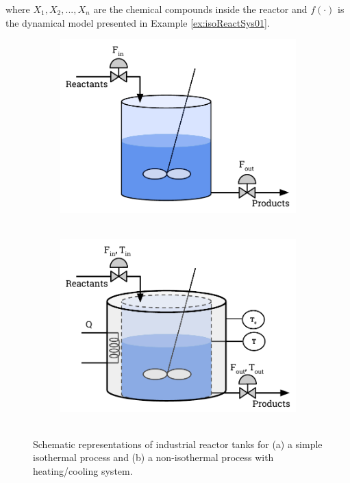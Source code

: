 \documentclass[a4paper,11pt]{book}
\numberwithin{figure}{chapter}
\numberwithin{equation}{chapter}
\numberwithin{table}{chapter}
\theoremstyle{definition}
\begin{document}
\noindent where $X_1, X_2, ..., X_n$ are the chemical compounds inside the reactor and $f(\cdot)$ is the dynamical model presented in Example \ref{ex:isoReactSys01}.

\begin{figure}[ht] 
    \centering
    \begin{subfigure}{0.49\textwidth}   
        \includegraphics[width=\textwidth]{chapter2/tank01}
        \caption{$\ \ \ \ \ $}  \label{fig:tank01a}
    \end{subfigure}
    \begin{subfigure}{0.49\textwidth}   
        \includegraphics[width=\textwidth]{chapter2/tank02}
        \caption{$\ \ \ \ \ $} \label{fig:tank01b}
    \end{subfigure}
    
    \caption{Schematic representations of industrial reactor tanks for (a) a simple isothermal process and (b) a non-isothermal process with heating/cooling system.} 
    \label{fig:tank01}
\end{figure}
\end{document}
